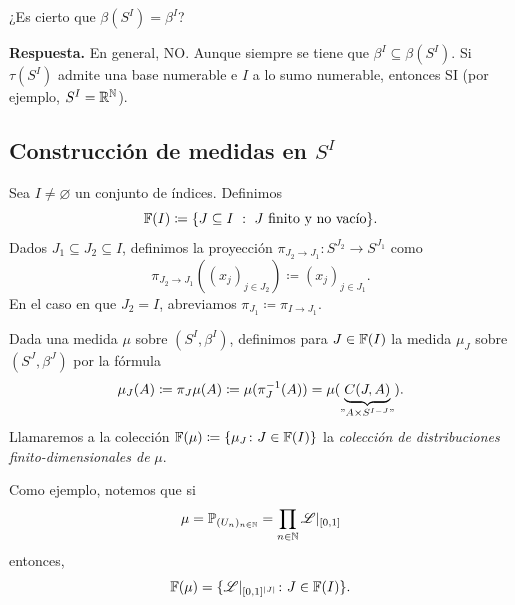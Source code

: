 \begin{pregunta}
	¿Es cierto que $\beta(S^{I}) = \beta^{I}$?
\end{pregunta}

\noindent \textbf{Respuesta.} En general, NO. Aunque siempre se tiene que $\beta^{I} \subseteq \beta(S^{I})$. Si $\tau(S^{I})$ admite una base numerable e $I$ a lo sumo numerable, entonces SI (por ejemplo, $S^{I} = \mathbb{R}^{\mathbb{N}}$).

\subsection{Construcción de medidas en $S^{I}$}
Sea $I \neq \varnothing$ un conjunto de índices. Definimos
\[ \mathbb{F}(I) \coloneq \{J \subseteq I \ : \ J \text{ finito y no vacío}\}.  \]
Dados $J_{1} \subseteq J_{2} \subseteq I$, definimos la proyección $\pi_{J_{2} \to J_{1}} \colon S^{J_{2}} \to S^{J_{1}}$ como
\[ \pi_{J_{2} \to J_{1}}((x_{j})_{j \in J_{2}}) \coloneq (x_{j})_{j \in J_{1}}. \]
En el caso en que $J_{2} = I$, abreviamos $\pi_{J_{1}} \coloneq \pi_{I \to J_{1}}$. \par
Dada una medida $\mu$ sobre $(S^{I}, \beta^{I})$, definimos para $J \in \mathbb{F}(I)$ la medida $\mu_{J}$ sobre $(S^{J}, \beta^{J})$ por la fórmula
\[ \mu_{J}(A) \coloneq \pi_{J} \mu(A) \coloneq \mu(\pi_{J}^{-1}(A)) = \mu(\underbrace{C(J,A)}_{"A \times S^{I - J}"}). \]
Llamaremos a la colección $\mathbb{F}(\mu) \coloneq \{\mu_{J} \colon J \in \mathbb{F}(I)\}$ la \textit{colección de distribuciones finito-dimensionales de} $\mu$. \par
Como ejemplo, notemos que si 
\[ \mu = \mathbb{P}_{(U_{n})_{n \in \mathbb{N}}} = \prod_{n \in \mathbb{N}} \mathscr{L}|_{[0,1]} \]
entonces,
\[ \mathbb{F}(\mu) = \{\mathscr{L}|_{[0,1]^{|J|}} \colon J \in \mathbb{F}(I)\}. \]

